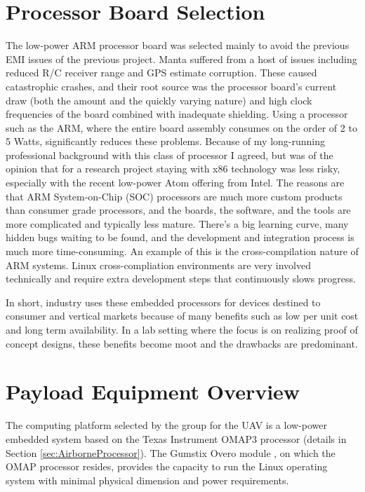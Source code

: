 \documentclass[a4paper,11pt]{report}
\begin{document}
\section{Processor Board Selection}

The low-power ARM processor board was selected mainly to avoid the previous EMI issues of the previous project. Manta suffered from a host of issues including reduced R/C receiver range and GPS estimate corruption. These caused catastrophic crashes, and their root source was the processor board's current draw (both the amount and the quickly varying nature) and high clock frequencies of the board combined with inadequate shielding. Using a processor such as the ARM, where the entire board assembly consumes on the order of 2 to 5 Watts, significantly reduces these problems. Because of my long-running professional background with this class of processor I agreed, but was of the opinion that for a research project staying with x86 technology was less risky, especially with the recent low-power Atom offering from Intel. The reasons are that ARM System-on-Chip (SOC) processors are much more custom products than consumer grade processors, and the boards, the software, and the tools are more complicated and typically less mature. There's a big learning curve, many hidden bugs waiting to be found, and the development and integration process is much more time-consuming. An example of this is the cross-compilation nature of ARM systems. Linux cross-compliation environments are very involved technically and require extra development steps that continuously slows progress.

In short, industry uses these embedded processors for devices destined to consumer and vertical markets because of many benefits such as low per unit cost and long term availability. In a lab setting where the focus is on realizing proof of concept designs, these benefits become moot and the drawbacks are predominant.
 
\section{Payload Equipment Overview}

The computing platform selected by the group for the UAV is a low-power embedded system based on the Texas Instrument OMAP3 processor (details in Section \ref{sec:AirborneProcessor}). The Gumstix Overo module \cite{Overo}, on which the OMAP processor resides, provides the capacity to run the Linux operating system with minimal physical dimension and power requirements. 
\end{document}
